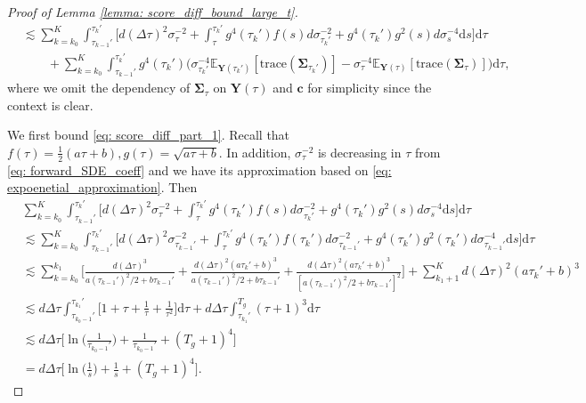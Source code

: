 \documentclass[11pt]{article}
\newcommand{\mE}{\mathbb{E}}
\newcommand{\bY}{\mathbf{Y}}
\newcommand{\bc}{\mathbf{c}}
\newcommand{\bSimga}{\boldsymbol{\Sigma}}
\newcommand{\intd}{\mathrm{d}}
\begin{document}
\begin{proof}[Proof of Lemma \ref{lemma: score_diff_bound_large_t}]
\begin{align}
    & \lesssim \sum_{k=k_0}^{K} \int_{\tau_{k -1}'}^{\tau_k'} \bigg[d(\Delta\tau)^2\sigma_\tau^{-2}  + \int_{\tau}^{\tau_k'}g^4(\tau_k')f(s)d\sigma^{-2}_{\tau_k'} + g^4(\tau_k')g^2(s)d\sigma^{-4}_{s} \intd s \bigg]\intd \tau \label{eq: score_diff_part_1}\\
    &\qquad  + \sum_{k=k_0}^{K}\int_{\tau_{k - 1}'}^{\tau_k'} g^4(\tau_k')\big(\sigma_{\tau_k'}^{-4}\mE_{\bY(\tau_k')}[\text{trace}(\bSimga_{\tau_k'})] - \sigma_{\tau}^{-4}\mE_{\bY(\tau)}[\text{trace}(\bSimga_{\tau})]\big) \intd\tau, \label{eq: score_diff_part_2}
\end{align}
where we omit the dependency of $\bSimga_\tau$ on $\bY(\tau)$ and $\bc$ for simplicity since the context is clear.



We first bound \eqref{eq: score_diff_part_1}. Recall that $f(\tau) = \frac{1}{2}(a\tau + b), g(\tau) = \sqrt{a\tau + b}$. In addition, $\sigma_\tau^{-2}$ is decreasing in $\tau$ from \eqref{eq: forward_SDE_coeff} and we have its approximation based on \eqref{eq: expoenetial_approximation}. Then
\begin{align}
    &\sum_{k=k_0}^{K} \int_{\tau_{k -1}'}^{\tau_k'} \bigg[d(\Delta\tau)^2\sigma_\tau^{-2}  + \int_{\tau}^{\tau_k'}g^4(\tau_k')f(s)d\sigma^{-2}_{\tau_k'} + g^4(\tau_k')g^2(s)d\sigma^{-4}_{s} \intd s \bigg]\intd \tau \nonumber\\
    &\lesssim \sum_{k=k_0}^{K}\int_{\tau_{k - 1}'}^{\tau_k'} \bigg[d(\Delta\tau)^2\sigma_{\tau_{k - 1}'}^{-2} + \int_{\tau}^{\tau_k'} g^4(\tau_k')f(\tau_k')d\sigma^{-2}_{\tau_{k - 1}'} + g^4(\tau_k')g^2(\tau_k')d\sigma^{-4}_{\tau_{k - 1}'} \intd s \bigg]\intd \tau \nonumber\\
    &\lesssim \sum_{k=k_0}^{k_1} \bigg[\frac{d(\Delta\tau)^3}{a(\tau_{k - 1}')^2/2 + b\tau_{k - 1}'}+ \frac{d(\Delta\tau)^2(a\tau_k' + b)^3}{a(\tau_{k - 1}')^2/2 + b\tau_{k - 1}'} + \frac{d(\Delta\tau)^2(a\tau_k' + b)^3}{[a(\tau_{k - 1}')^2/2 + b\tau_{k - 1}']^2}\bigg] + \sum_{k_1 + 1}^{K} d(\Delta\tau)^2(a\tau_k' + b)^3\nonumber\\
    &\lesssim d\Delta\tau\int_{\tau_{k_0 - 1}'}^{\tau_{k_1}'}  \bigg[1 + \tau + \frac{1}{\tau} + \frac{1}{\tau^2}\bigg] \intd\tau + d\Delta\tau\int_{\tau_{k_1}'}^{T_g}  (\tau + 1)^3 \intd\tau\nonumber\\
    &\lesssim d\Delta\tau\bigg[\ln\bigg(\frac{1}{\tau_{k_0 - 1}'} \bigg) + \frac{1}{\tau_{k_0 - 1}'} + (T_g + 1)^4 \bigg]\nonumber\\
    &= d\Delta\tau\bigg[\ln\bigg(\frac{1}{s} \bigg) + \frac{1}{s} + (T_g + 1)^4 \bigg].\label{eq: score_diff_bound_1}
\end{align}


\end{proof}
\end{document}
